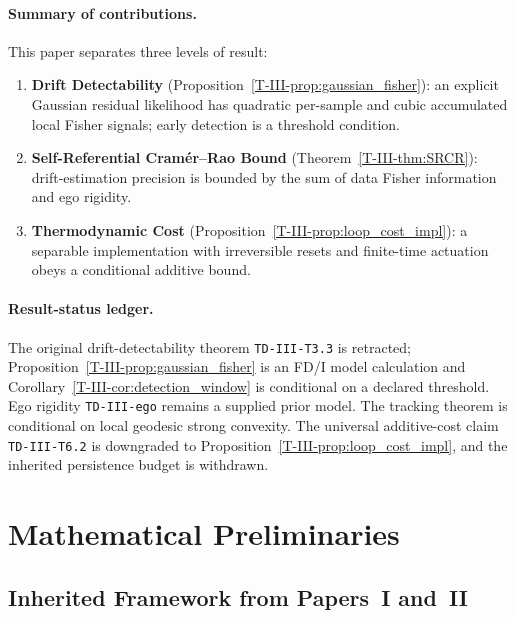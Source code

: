 \documentclass[12pt,a4paper,openany]{book}
\begin{document}
\paragraph{Summary of contributions.}
This paper separates three levels of result:
\begin{enumerate}
\item \textbf{Drift Detectability}
  (Proposition~\ref{T-III-prop:gaussian_fisher}): an explicit Gaussian
  residual likelihood has quadratic per-sample and cubic accumulated
  local Fisher signals; early detection is a threshold condition.
\item \textbf{Self-Referential Cram\'{e}r--Rao Bound}
  (Theorem~\ref{T-III-thm:SRCR}):
  drift-estimation precision is bounded by the sum of
  data Fisher information and ego rigidity.
\item \textbf{Thermodynamic Cost}
  (Proposition~\ref{T-III-prop:loop_cost_impl}): a separable implementation
  with irreversible resets and finite-time actuation obeys a conditional
  additive bound.
\end{enumerate}

\paragraph{Result-status ledger.}
The original drift-detectability theorem
\texttt{TD-III-T3.3} is retracted;
Proposition~\ref{T-III-prop:gaussian_fisher} is an FD/I model calculation and
Corollary~\ref{T-III-cor:detection_window} is conditional on a declared
threshold.  Ego rigidity \texttt{TD-III-ego} remains a supplied prior
model.  The tracking theorem is conditional on local geodesic strong
convexity.  The universal additive-cost claim
\texttt{TD-III-T6.2} is downgraded to
Proposition~\ref{T-III-prop:loop_cost_impl}, and the inherited persistence
budget is withdrawn.

\section{Mathematical Preliminaries}
\label{T-III-sec:prelim}

\subsection{Inherited Framework from Papers~I and~II}
\label{T-III-subsec:inherited}
\end{document}
